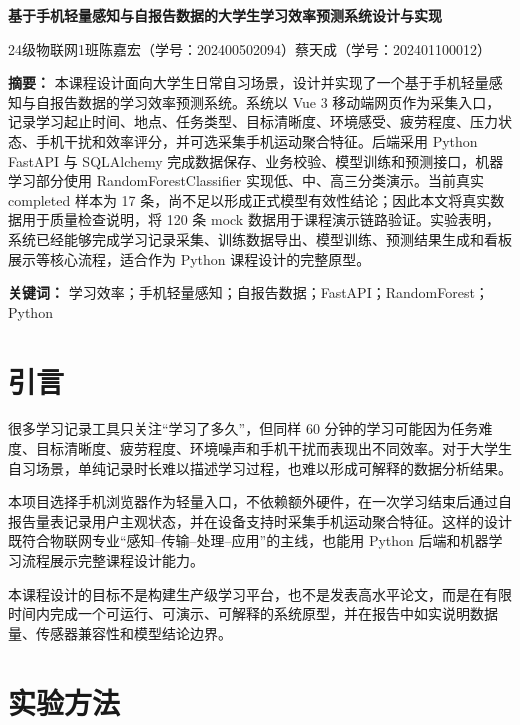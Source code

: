 \documentclass[UTF8,a4paper,fontset=fandol]{ctexart}
\newcommand{\memberone}{陈嘉宏（学号：202400502094）}
\newcommand{\membertwo}{蔡天成（学号：202401100012）}
\newcommand{\classname}{24级物联网1班}
\newcommand{\paperTitle}{基于手机轻量感知与自报告数据的大学生学习效率预测系统设计与实现}
\begin{document}
\begin{center}
  {\LARGE\bfseries\color{journalblue}\paperTitle\par}
  \vspace{0.6em}
  {\normalsize \classname\quad \memberone\quad \membertwo\par}
  \vspace{0.8em}
\end{center}
\noindent\textbf{摘要：}
本课程设计面向大学生日常自习场景，设计并实现了一个基于手机轻量感知与自报告数据的学习效率预测系统。系统以 Vue 3 移动端网页作为采集入口，记录学习起止时间、地点、任务类型、目标清晰度、环境感受、疲劳程度、压力状态、手机干扰和效率评分，并可选采集手机运动聚合特征。后端采用 Python FastAPI 与 SQLAlchemy 完成数据保存、业务校验、模型训练和预测接口，机器学习部分使用 RandomForestClassifier 实现低、中、高三分类演示。当前真实 completed 样本为 17 条，尚不足以形成正式模型有效性结论；因此本文将真实数据用于质量检查说明，将 120 条 mock 数据用于课程演示链路验证。实验表明，系统已经能够完成学习记录采集、训练数据导出、模型训练、预测结果生成和看板展示等核心流程，适合作为 Python 课程设计的完整原型。

\vspace{0.45em}
\noindent\textbf{关键词：} 学习效率；手机轻量感知；自报告数据；FastAPI；RandomForest；Python
\vspace{1.0em}

\section{引言}

很多学习记录工具只关注“学习了多久”，但同样 60 分钟的学习可能因为任务难度、目标清晰度、疲劳程度、环境噪声和手机干扰而表现出不同效率。对于大学生自习场景，单纯记录时长难以描述学习过程，也难以形成可解释的数据分析结果。

本项目选择手机浏览器作为轻量入口，不依赖额外硬件，在一次学习结束后通过自报告量表记录用户主观状态，并在设备支持时采集手机运动聚合特征。这样的设计既符合物联网专业“感知--传输--处理--应用”的主线，也能用 Python 后端和机器学习流程展示完整课程设计能力。

本课程设计的目标不是构建生产级学习平台，也不是发表高水平论文，而是在有限时间内完成一个可运行、可演示、可解释的系统原型，并在报告中如实说明数据量、传感器兼容性和模型结论边界。

\section{实验方法}
\end{document}
